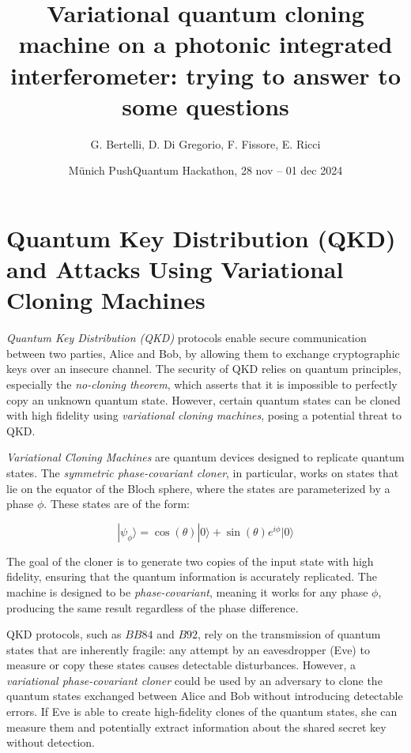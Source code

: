 \documentclass{article}
\theoremstyle{definition}
\theoremstyle{proposition}
\begin{document}
\title{Variational quantum cloning machine on a photonic integrated interferometer: trying to answer to some questions}
\author{G. Bertelli, D. Di Gregorio, F. Fissore, E. Ricci}
\date{M\"unich PushQuantum Hackathon, 28 nov -- 01 dec 2024}


\maketitle
\section{Quantum Key Distribution (QKD) and Attacks Using Variational Cloning Machines}


\textit{Quantum Key Distribution (QKD)} protocols enable secure communication between two parties, Alice and Bob, by allowing them to exchange cryptographic keys over an insecure channel. The security of QKD relies on quantum principles, especially the \textit{no-cloning theorem}, which asserts that it is impossible to perfectly copy an unknown quantum state. However, certain quantum states can be cloned with high fidelity using \textit{variational cloning machines}, posing a potential threat to QKD.

\textit{Variational Cloning Machines} are quantum devices designed to replicate quantum states. The \textit{symmetric phase-covariant cloner}, in particular, works on states that lie on the equator of the Bloch sphere, where the states are parameterized by a phase \( \phi \). These states are of the form:

\[
|\psi_\phi\rangle = \cos(\theta)|0\rangle + \sin(\theta) e^{i\phi}|0\rangle
\]

The goal of the cloner is to generate two copies of the input state with high fidelity, ensuring that the quantum information is accurately replicated. The machine is designed to be \textit{phase-covariant}, meaning it works for any phase \( \phi \), producing the same result regardless of the phase difference.

QKD protocols, such as $BB84$ and $B92$, rely on the transmission of quantum states that are inherently fragile: any attempt by an eavesdropper (Eve) to measure or copy these states causes detectable disturbances. However, a \textit{variational phase-covariant cloner} could be used by an adversary to clone the quantum states exchanged between Alice and Bob without introducing detectable errors. If Eve is able to create high-fidelity clones of the quantum states, she can measure them and potentially extract information about the shared secret key without detection.
\end{document}

